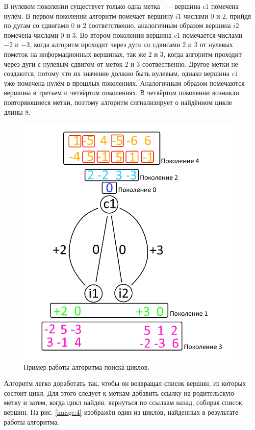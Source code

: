 \documentclass[14pt]{mmcs-article}
\begin{document}
В нулевом поколении существует только одна метка ~--- вершина $c1$ помечена нулём. В первом поколении алгоритм помечает вершину $i1$ числами $0$ и $2$, прийдя по дугам со сдвигами $0$ и $2$ соответственно, аналогичным образом вершина $i2$ помечена числами $0$ и $3$. Во втором поколении вершина $c1$ помечается числами $-2$ и $-3$, когда алгоритм проходит через дуги со сдвигами $2$ и $3$ от нулевых пометок на информационных вершинах, так же $2$ и $3$, когда алгоритм проходит через дуги с нулевым сдвигом от меток $2$ и $3$ соотвественно. Другое метки не создаются, потому что их значение должно быть нулевым, однако вершина $c1$ уже помечена нулём в прошлых поколениях. Аналогичным образом помечаются вершины в третьем и четвёртом поколениях. В четвёртом поколении возникли повторяющиеся метки, поэтому алгоритм сигнализирует о найдённом цикле длины $8$.

\begin{figure}[H]
  \centering
  \includegraphics[scale=0.4]{Fig_3.png}
  \caption{ Пример работы алгоритма поиска циклов. }
  \label{image:3}
\end{figure}

Алгоритм легко доработать так, чтобы он возвращал список вершин, из которых состоит цикл. Для этого следует к меткам добавить ссылку на родительскую метку и затем, когда цикл найден, вернуться по ссылкам назад, собирая список вершин. На рис. \ref{image:4} изображён один из циклов, найденных в результате работы алгоритма. 
\end{document}
